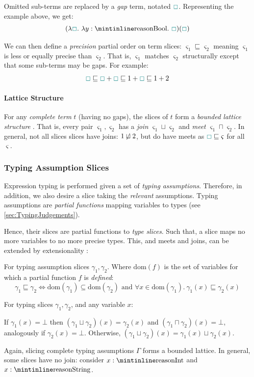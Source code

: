 Omitted sub-terms are replaced by a \textit{gap} term, notated ${\color{teal}\Box}$. Representing the example above, we get:
\[(\lambda \gap.\ \lambda y : \code{Bool}.\ \gap)(\gap)\]

We can then define a \textit{precision} partial order \cite{PartialOrder} on term slices: $\varsigma_1 \sqsubseteq \varsigma_2$ meaning $\varsigma_1$ is less or equally precise than $\varsigma_2$. That is, $\varsigma_1$ matches $\varsigma_2$ structurally except that some sub-terms may be gaps. For example:
\[{\color{teal}\Box} \sqsubseteq{\color{teal}\Box} + {\color{teal}\Box}\sqsubseteq 1 + {\color{teal}\Box} \sqsubseteq 1 + 2\]

\paragraph{Lattice Structure}\label{sec:JoinTypesTheory} For any \textit{complete term} $t$ (having no gaps), the slices of $t$ form a \textit{bounded lattice structure} \cite{Lattice}. That is, every pair $\varsigma_1, \varsigma_2$ has a \textit{join} $\varsigma_1 \sqcup \varsigma_2$ and \textit{meet} $\varsigma_1 \sqcap \varsigma_2$. In general, not all slices slices have joins: $1 \centernot\sqcup 2$, but do have meets as ${\color{teal}\Box} \sqsubseteq \varsigma$ for all $\varsigma$.
 
\subsubsection{Typing Assumption Slices}
Expression typing is performed given a set of \textit{typing assumptions}. Therefore, in addition, we also desire a slice taking the \textit{relevant} assumptions. Typing assumptions are \textit{partial functions} mapping variables to types (see \cref{sec:TypingJudgements}). 

Hence, their slices are partial functions to \textit{type slices}. Such that, a slice maps no more variables to no more precise types. This, and meets and joins, can be extended by extensionality \cite{Extensionality}:

\begin{definition}
For typing assumption slices $\gamma_1, \gamma_2$. Where $\mathrm{dom}(f)$ is the set of variables for which a partial function $f$ is \textit{defined}:
\[\gamma_1 \sqsubseteq \gamma_2 \iff \mathrm{dom}(\gamma_1) \subseteq \mathrm{dom}(\gamma_2) \text{ and } \forall x \in  \mathrm{dom}(\gamma_1).\ \gamma_1(x) \sqsubseteq \gamma_2(x)\]
\end{definition}
\begin{definition}
For typing slices $\gamma_1, \gamma_2$, and any variable $x$: 

If $\gamma_1(x) = \bot$ then $(\gamma_1 \sqcup \gamma_2)(x) = \gamma_2(x)$ and $(\gamma_1 \sqcap \gamma_2)(x) = \bot$, analogously if $\gamma_2(x) = \bot$. Otherwise, $(\gamma_1 \sqcup \gamma_2)(x) = \gamma_1(x) \sqcup \gamma_2(x)$.
\end{definition}
Again, slicing complete typing assumptions $\Gamma$ forms a bounded lattice. In general, some slices have no join: consider $x : \code{Int}$ and $x : \code{String}$.

